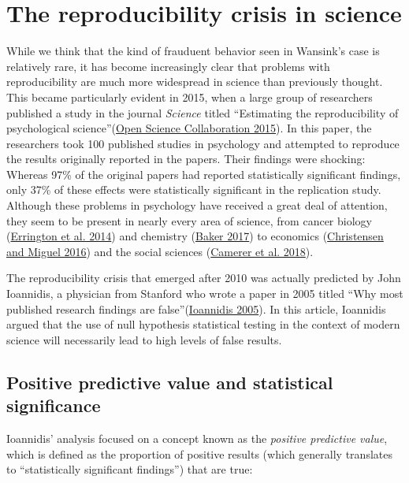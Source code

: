 \documentclass[
  12pt,
]{book}
\begin{document}
\hypertarget{the-reproducibility-crisis-in-science}{%
\section{The reproducibility crisis in science}\label{the-reproducibility-crisis-in-science}}

While we think that the kind of frauduent behavior seen in Wansink's case is relatively rare, it has become increasingly clear that problems with reproducibility are much more widespread in science than previously thought. This became particularly evident in 2015, when a large group of researchers published a study in the journal \emph{Science} titled ``Estimating the reproducibility of psychological science''(\protect\hyperlink{ref-open:2015}{Open Science Collaboration 2015}). In this paper, the researchers took 100 published studies in psychology and attempted to reproduce the results originally reported in the papers. Their findings were shocking: Whereas 97\% of the original papers had reported statistically significant findings, only 37\% of these effects were statistically significant in the replication study. Although these problems in psychology have received a great deal of attention, they seem to be present in nearly every area of science, from cancer biology (\protect\hyperlink{ref-erri:iorn:gunn:2014}{Errington et al. 2014}) and chemistry (\protect\hyperlink{ref-bake:2017}{Baker 2017}) to economics (\protect\hyperlink{ref-NBERw22989}{Christensen and Miguel 2016}) and the social sciences (\protect\hyperlink{ref-Camerer2018EvaluatingTR}{Camerer et al. 2018}).

The reproducibility crisis that emerged after 2010 was actually predicted by John Ioannidis, a physician from Stanford who wrote a paper in 2005 titled ``Why most published research findings are false''(\protect\hyperlink{ref-ioan:2005}{Ioannidis 2005}). In this article, Ioannidis argued that the use of null hypothesis statistical testing in the context of modern science will necessarily lead to high levels of false results.

\hypertarget{positive-predictive-value-and-statistical-significance}{%
\subsection{Positive predictive value and statistical significance}\label{positive-predictive-value-and-statistical-significance}}

Ioannidis' analysis focused on a concept known as the \emph{positive predictive value}, which is defined as the proportion of positive results (which generally translates to ``statistically significant findings'') that are true:
\end{document}
